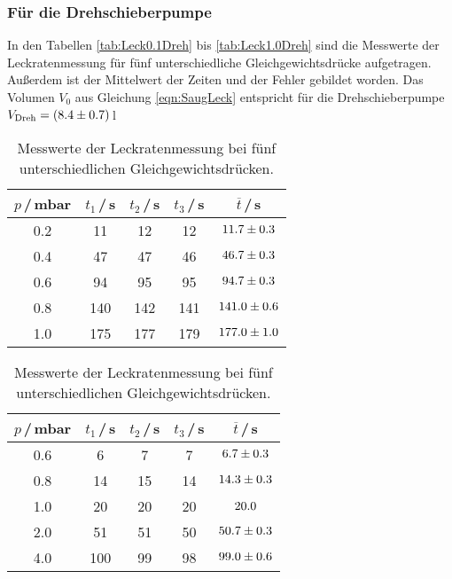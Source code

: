 \subsubsection{Für die Drehschieberpumpe}
In den Tabellen \eqref{tab:Leck0.1Dreh} bis \eqref{tab:Leck1.0Dreh} sind die Messwerte der Leckratenmessung für fünf unterschiedliche Gleichgewichtsdrücke aufgetragen. Außerdem ist der Mittelwert der Zeiten und der Fehler gebildet worden. Das Volumen $V_0$ aus Gleichung \eqref{eqn:SaugLeck} entspricht für die Drehschieberpumpe $V_\text{Dreh} = (\num{8.4 +- 0.7})$\,l

\begin{table}[H]
  \caption{Messwerte der Leckratenmessung bei fünf unterschiedlichen Gleichgewichtsdrücken.}
  \begin{subtable}{0.45\textwidth}
    \begin{tabular}{c|c|c|c|c}\label{tab:Leck0.1Dreh}
      $p$\,/\,mbar & $t_1$\,/\,s & $t_2$\,/\,s & $t_3$\,/\,s & $\overline{t}$\,/\,s \\
      \hline
      0.2 & 11  & 12  & 12  & $\num{11.7 +- 0.3}$ \\
      0.4 & 47  & 47  & 46  & $\num{46.7 +- 0.3}$ \\
      0.6 & 94  & 95  & 95  & $\num{94.7 +- 0.3}$ \\
      0.8 & 140 & 142 & 141 & $\num{141.0 +- 0.6}$ \\
      1.0 & 175 & 177 & 179 & $\num{177.0 +- 1.0}$ \\
    \end{tabular}
  \end{subtable}\hfill
  \begin{subtable}{0.45\textwidth}
    \begin{tabular}{c|c|c|c|c}\label{tab:Leck0.4Dreh}
      $p$\,/\,mbar & $t_1$\,/\,s & $t_2$\,/\,s & $t_3$\,/\,s & $\overline{t}$\,/\,s \\
      \hline
      0.6 & 6   & 7  & 7  & $\num{6.7 +- 0.3}$ \\
      0.8 & 14  & 15 & 14 & $\num{14.3 +- 0.3}$ \\
      1.0 & 20  & 20 & 20 & $\num{20.0 +- 0.0}$ \\
      2.0 & 51  & 51 & 50 & $\num{50.7 +- 0.3}$ \\
      4.0 & 100 & 99 & 98 & $\num{99.0 +- 0.6}$ \\
    \end{tabular}
  \end{subtable}


\end{table}
